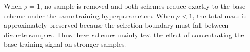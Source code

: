 When $\rho=1$, no sample is removed and both schemes reduce exactly to the base scheme under the
same training hyperparameters.  When $\rho<1$, the
total mass is approximately preserved because the selection boundary
must fall between discrete samples.  Thus these schemes mainly test the
effect of concentrating the base training signal on stronger samples.










